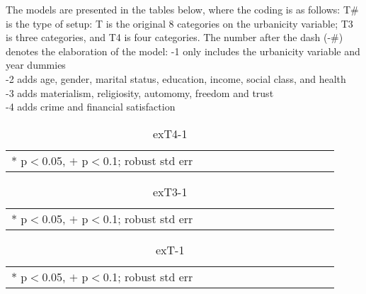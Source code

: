 \documentclass[11pt, letterpaper]{article}
\begin{document}
\begin{spacing}{1.4}
The models are presented in the tables below, where the coding is as follows:
T\# is the type of setup: T is the original 8 categories on the urbanicity
variable; T3 is three categories, and T4 is four categories. 
The number after the dash (-\#) denotes the elaboration of the model:
-1 only includes the urbanicity variable and year dummies\\
-2 adds  age, gender, marital status,  education, income, social class, and health\\
-3 adds materialism, religiosity, automomy, freedom and trust\\
-4 adds crime and financial satisfaction


\begin{spacing}{.9} \begin{table}[H]\centering  \label{exT4-1} \begin{scriptsize} \begin{tabular}{p{1.0in}p{.5in}p{.5in}p{.5in}p{.5in}p{.5in}p{.5in}p{.5in}p{.5in}p{.5in}p{.5 in}p{.5in}p{.5 in}}\hline  \hline   * p$<$0.05, $+$ p$<$0.1; robust std err \end{tabular}\end{scriptsize}\caption{exT4-1}\end{table} \end{spacing}

\begin{spacing}{.9} \begin{table}[H]\centering  \label{exT3-1} \begin{scriptsize} \begin{tabular}{p{1.0in}p{.5in}p{.5in}p{.5in}p{.5in}p{.5in}p{.5in}p{.5in}p{.5in}p{.5in}p{.5 in}p{.5in}p{.5 in}}\hline  \hline   * p$<$0.05, $+$ p$<$0.1; robust std err \end{tabular}\end{scriptsize}\caption{exT3-1}\end{table} \end{spacing}

\begin{spacing}{.9} \begin{table}[H]\centering  \label{exT-1} \begin{scriptsize} \begin{tabular}{p{1.0in}p{.5in}p{.5in}p{.5in}p{.5in}p{.5in}p{.5in}p{.5in}p{.5in}p{.5in}p{.5 in}p{.5in}p{.5 in}}\hline  \hline   * p$<$0.05, $+$ p$<$0.1; robust std err \end{tabular}\end{scriptsize}\caption{exT-1}\end{table} \end{spacing}



\end{spacing}
\end{document}
